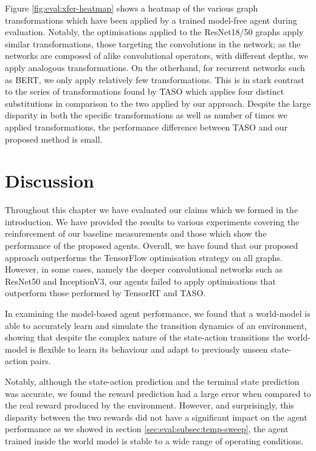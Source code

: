 Figure \ref{fig:eval:xfer-heatmap} shows a heatmap of the various graph transformations which have been applied by a trained model-free agent during evaluation. Notably, the optimisations applied to the ResNet18/50 graphs apply similar transformations, those targeting the convolutions in the network; as the networks are composed of alike convolutional operators, with different depths, we apply analogous transformations. On the otherhand, for recurrent networks such as BERT, we only apply relatively few transformations. This is in stark contrast to the series of transformations found by TASO which applies four distinct substitutions in comparison to the two applied by our approach. Despite the large disparity in both the specific transformations as well as number of times we applied transformations, the performance difference between TASO and our proposed method is small.

\section{Discussion}
Throughout this chapter we have evaluated our claims which we formed in the introduction. We have provided the results to various experiments covering the reinforcement of our baseline measurements and those which show the performance of the proposed agents. Overall, we have found that our proposed approach outperforms the TensorFlow optimisation strategy on all graphs. However, in some cases, namely the deeper convolutional networks such as ResNet50 and InceptionV3, our agents failed to apply optimisations that outperform those performed by TensorRT and TASO.

In examining the model-based agent performance, we found that a world-model is able to accurately learn and simulate the transition dynamics of an environment, showing that despite the complex nature of the state-action transitions the world-model is flexible to learn its behaviour and adapt to previously unseen state-action pairs. 

Notably, although the state-action prediction and the terminal state prediction was accurate, we found the reward prediction had a large error when compared to the real reward produced by the environment. However, and surprisingly, this disparity between the two rewards did not have a significant impact on the agent performance as we showed in section \ref{sec:eval:subsec:temp-sweep}, the agent trained inside the world model is stable to a wide range of operating conditions.

